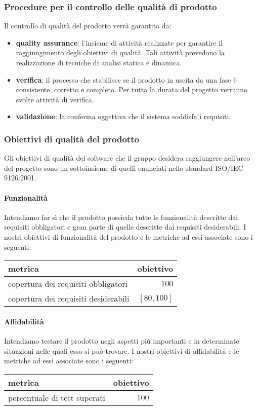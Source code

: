 		\subsubsection{Procedure per il controllo delle qualità di prodotto}
		Il controllo di qualità del prodotto verrà garantito da:
		\begin{itemize}
			\item \textbf{quality assurance}: l'insieme di attività realizzate per garantire il raggiungimento degli obiettivi di qualità. Tali attività prevedono la realizzazione di tecniche di analisi statica e dinamica.
			\item \textbf{verifica}: il processo che stabilisce se il prodotto in uscita da una fase è consistente, corretto e completo. Per tutta la durata del progetto verranno svolte attività di verifica.
			\item \textbf{validazione}: la conferma oggettiva che il sistema soddisfa i requisiti.
		\end{itemize}
		\subsubsection{Obiettivi di qualità del prodotto} \label{sec:ob_qual_sw}
		Gli obiettivi di qualità del software che il gruppo \hx{} desidera raggiungere nell'arco del progetto sono un sottoinsieme di quelli enunciati nello standard ISO/IEC 9126:2001.

	\paragraph{Funzionalità}
	Intendiamo far sì che il prodotto possieda tutte le funzionalità descritte dai requisiti obbligatori e gran parte di quelle descritte dai requisiti desiderabili. I nostri obiettivi di funzionalità del prodotto e le metriche ad essi associate sono i seguenti:
	\begin{center}
	\begin{tabular}{| l | r |}
		\hline
		\textbf{metrica} & \textbf{obiettivo} \\
		\hline
		copertura dei requisiti obbligatori & $100$ \\
		\hline
		copertura dei requisiti desiderabili & $[80, 100]$ \\
		\hline
	\end{tabular}
	\end{center}

	\paragraph{Affidabilità}
	Intendiamo testare il prodotto negli aspetti più importanti e in determinate situazioni nelle quali esso si può trovare. I nostri obiettivi di affidabilità e le metriche ad essi associate sono i seguenti:
	\begin{center}
	\begin{tabular}{| l | r |}
		\hline
		\textbf{metrica} & \textbf{obiettivo} \\
		\hline
		percentuale di test superati & $100$ \\
		\hline
	\end{tabular}
	\end{center}

